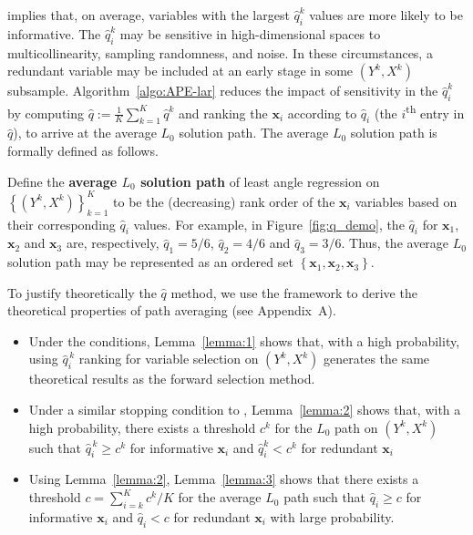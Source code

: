 \documentclass[11pt,review,authoryear]{elsarticle}
\begin{document}
\citet[Theorem 2]{zhang09} implies that, on average, variables with the largest $\widehat{q}^k_i$ values are more likely to be informative. The $\widehat{q}^k_i$ may be sensitive in high-dimensional spaces to multicollinearity, sampling randomness, and noise. In these circumstances, a redundant variable may be included at an early stage in some $\left( Y^k, X^k \right)$ subsample. Algorithm~\ref{algo:APE-lar} reduces the impact of sensitivity in the $\widehat{q}^k_i$ by computing $\widehat{q} := \frac{1}{K} \sum_{k=1}^{K} \widehat{q}^k$ and ranking the $\mathbf{x}_i$ according to $\widehat{q}_i$ (the $i$\textsuperscript{th} entry in $\widehat{q}$), to arrive at the average $L_0$ solution path. The average $L_0$ solution path is formally defined as follows.


\begin{definition}
  Define the \textbf{average $L_0$ solution path} of least angle regression on $\left\{ \left( Y^k, X^k \right) \right\}_{k=1}^{K}$ to be the (decreasing) rank order of the $\mathbf{x}_i$ variables based on their corresponding $\widehat{q}_i$ values. For example, in Figure~\ref{fig:q_demo}, the $\widehat{q}_i$ for $\mathbf{x}_1$, $\mathbf{x}_2$ and $\mathbf{x}_3$ are, respectively, $\widehat{q}_1 = 5/6$, $\widehat{q}_2 = 4/6$ and $\widehat{q}_3 = 3/6$. Thus, the average $L_0$ solution path may be represented as an ordered set $\left\{ \mathbf{x}_1, \mathbf{x}_2, \mathbf{x}_3 \right\}$.
  \label{def:L_0_solution_path}
\end{definition}


To justify theoretically the $\widehat{q}$ method, we use the \citet{zhang09} framework to derive the theoretical properties of path averaging (see Appendix~A).

\begin{itemize}
  \item Under the \citet{zhang09} conditions, Lemma~\ref{lemma:1} shows that, with a high probability, using $\widehat{q}^{\,k}_i$ ranking for variable selection on $\left( Y^k, X^k \right)$ generates the same theoretical results as the \citet{zhang09} forward selection method.
  \item Under a similar stopping condition to \citet{zhang09}, Lemma~\ref{lemma:2} shows that, with a high probability, there exists a threshold $c^k$ for the $L_0$ path on $\left( Y^k, X^k \right)$ such that $\widehat{q}^{\,k}_i \geqslant c^k$ for informative $\mathbf{x}_i$ and $\widehat{q}^k_i < c^k$ for redundant $\mathbf{x}_i$
  \item Using Lemma~\ref{lemma:2}, Lemma~\ref{lemma:3} shows that there exists a threshold $c = \sum_{i=k}^{K} c^k/K$ for the average $L_0$ path such that $\widehat{q}_i \geqslant c$ for informative $\mathbf{x}_i$ and $\widehat{q}_i < c$ for redundant $\mathbf{x}_i$ with large probability.
\end{itemize}
\end{document}
